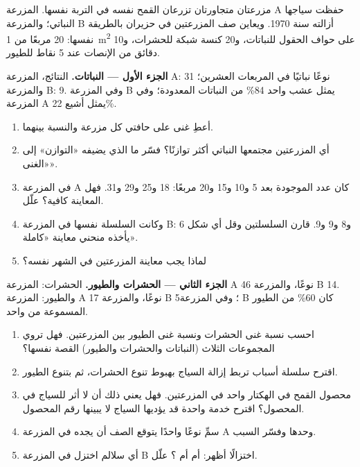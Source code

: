 \begin{problem}
\label{pb:g10:biodiversity-scales:1}
مزرعتان متجاورتان تزرعان القمح نفسه في التربة نفسها. المزرعة A حفظت
سياجها النباتي؛ والمزرعة B أزالته سنة 1970. ويعاين صف المزرعتين في
حزيران بالطريقة نفسها: 20 مربعًا من \qty{1}{m^2} على حواف الحقول
للنباتات، و20 كنسة شبكة للحشرات، و10 دقائق من الإنصات عند 5 نقاط
للطيور.

\medskip
\noindent\textbf{الجزء الأول --- النباتات.}
النتائج، المزرعة A: 31 نوعًا نباتيًا في المربعات العشرين؛ والمزرعة B:
9. وفي المزرعة B يمثل عشب واحد 84\% من النباتات المعدودة؛ وفي المزرعة
A يمثل أشيع  22\%.
\begin{enumerate}
  \item أعطِ غنى  على حافتي كل مزرعة والنسبة بينهما.
  \item أي المزرعتين مجتمعها النباتي أكثر توازنًا؟ فسّر ما الذي
        يضيفه «التوازن» إلى «الغنى».
  \item في المزرعة A كان عدد  الموجودة بعد 5 و10 و15 و20
        مربعًا: 18 و25 و29 و31. فهل المعاينة كافية؟ علّل.
  \item وكانت السلسلة نفسها في المزرعة B: 6 و8 و9 و9. قارن السلسلتين
        وقل أي شكل يأخذه منحني معاينة «كاملة».
  \item لماذا يجب معاينة المزرعتين في الشهر نفسه؟
\end{enumerate}

\medskip
\noindent\textbf{الجزء الثاني --- الحشرات والطيور.}
الحشرات: المزرعة A 46 نوعًا، والمزرعة B 14. والطيور: المزرعة A 17
نوعًا، والمزرعة B 5؛ وفي المزرعة B كان 60\% من الطيور المسموعة من 
واحد.
\begin{enumerate}[resume]
  \item احسب نسبة غنى الحشرات ونسبة غنى الطيور بين المزرعتين. فهل
        تروي المجموعات الثلاث (النباتات والحشرات والطيور) القصة
        نفسها؟
  \item اقترح سلسلة أسباب تربط إزالة السياج بهبوط تنوع الحشرات، ثم
        بتنوع الطيور.
  \item محصول القمح في الهكتار واحد في المزرعتين. فهل يعني ذلك أن لا
        أثر للسياج في المحصول؟ اقترح خدمة واحدة قد يؤديها السياج لا
        يبينها رقم المحصول.
  \item سمِّ نوعًا واحدًا يتوقع الصف أن يجده في المزرعة A وحدها وفسّر
        السبب.
  \item أي سلالم  اختزل في المزرعة B اختزالًا أظهر:
         أم  أم ؟ علّل.
\end{enumerate}


\end{problem}
